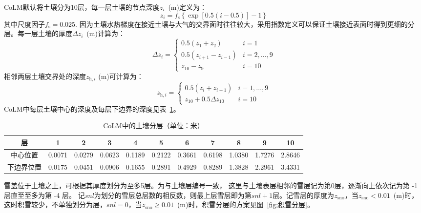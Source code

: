 CoLM默认将土壤分为10层，每一层土壤的节点深度$z_i$~(m)定义为：
\begin{equation}\label{eq:z_soi}
  z_{i} = f_{\mathrm{s}}\left\{ \exp{\left\lbrack 0.5(i - 0.5) \right\rbrack} - 1 \right\}
\end{equation}
其中尺度因子$f_{\mathrm {s}}=0.025$. 因为土壤水热梯度在接近土壤与大气的交界面时往往较大，采用指数定义可以保证土壤接近表面时得到更细的分层。每一层土壤的厚度$\Delta z_i$~(m)计算为：
\begin{equation}
  \Delta z_{i}=\left\{\begin{array}{ll}0.5\left(z_{1}+z_{2}\right) & i=1 \\
      0.5\left(z_{i+1}-z_{i-1}\right) & i=2, \ldots, 9 \\
  z_{10}-z_{9} & i=10\end{array}\right.
\end{equation}
相邻两层土壤交界处的深度$z_{\mathrm{h},i}$ (m)可计算为：
\begin{equation}
  z_{\mathrm{h},i}=\left\{\begin{array}{ll}0.5\left(z_{i}+z_{i+1}\right) & i=1, \ldots, 9 \\
  z_{10}+0.5 \Delta z_{10} & i=10\end{array}\right.
\end{equation}
CoLM中每层土壤中心的深度及每层下边界的深度见表~\ref{table:土壤分层}。

\begin{table}[b]
  \caption{CoLM中的土壤分层（单位：米）} \label{table:土壤分层}
  \centering \renewcommand{\arraystretch}{1.2} \footnotesize
  \begin{tabular}{ccccccccccc}
    \toprule
    层         & 1      & 2      & 3      & 4      & 5      & 6      & 7      & 8      & 9      & 10     \\
    \midrule
    中心位置   & 0.0071 & 0.0279 & 0.0623 & 0.1189 & 0.2122 & 0.3661 & 0.6198 & 1.0380 & 1.7276 & 2.8646 \\
    下边界位置 & 0.0175 & 0.0451 & 0.0906 & 0.1655 & 0.2891 & 0.4929 & 0.8289 & 1.3828 & 2.2961 & 3.4331 \\
    \bottomrule
  \end{tabular}
\end{table}


雪盖位于土壤之上，可根据其厚度划分为至多5层。为与土壤层编号一致，
这里与土壤表层相邻的雪层记为第0层，逐渐向上依次记为第 -1 层直至至多为第 -4 层。
记$snl$为划分的雪层总层数的相反数，则最上层雪层即为第$snl+1$层。记雪层的厚度为$z_{\mathrm{sno}}$，当$z_{\mathrm{sno}}<0.01$~(m)时，这时积雪较少，不单独划分为层，$snl=0$，当$z_{\mathrm{sno}}\geqslant 0.01$~(m)时，积雪分层的方案见图~\ref{fig:积雪分层}。

